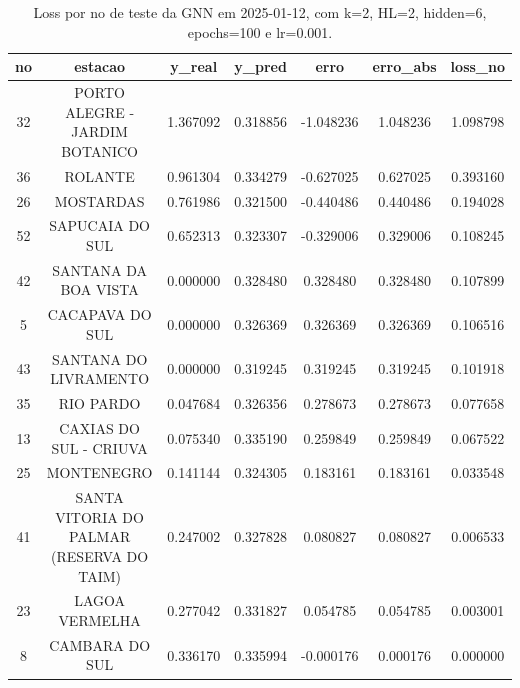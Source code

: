 \begin{table}[h]
\centering
\caption{Loss por no de teste da GNN em 2025-01-12, com k=2, HL=2, hidden=6, epochs=100 e lr=0.001.}
\label{tab:gnn_loss_k2_hl2_h6_e100_d20250112}
\begin{tabular}{ccccccc}
\toprule
no & estacao & y\_real & y\_pred & erro & erro\_abs & loss\_no \\
\midrule
32 & PORTO ALEGRE - JARDIM BOTANICO & 1.367092 & 0.318856 & -1.048236 & 1.048236 & 1.098798 \\
36 & ROLANTE & 0.961304 & 0.334279 & -0.627025 & 0.627025 & 0.393160 \\
26 & MOSTARDAS & 0.761986 & 0.321500 & -0.440486 & 0.440486 & 0.194028 \\
52 & SAPUCAIA DO SUL & 0.652313 & 0.323307 & -0.329006 & 0.329006 & 0.108245 \\
42 & SANTANA DA BOA VISTA & 0.000000 & 0.328480 & 0.328480 & 0.328480 & 0.107899 \\
5 & CACAPAVA DO SUL & 0.000000 & 0.326369 & 0.326369 & 0.326369 & 0.106516 \\
43 & SANTANA DO LIVRAMENTO & 0.000000 & 0.319245 & 0.319245 & 0.319245 & 0.101918 \\
35 & RIO PARDO & 0.047684 & 0.326356 & 0.278673 & 0.278673 & 0.077658 \\
13 & CAXIAS DO SUL - CRIUVA & 0.075340 & 0.335190 & 0.259849 & 0.259849 & 0.067522 \\
25 & MONTENEGRO & 0.141144 & 0.324305 & 0.183161 & 0.183161 & 0.033548 \\
41 & SANTA VITORIA DO PALMAR (RESERVA DO TAIM) & 0.247002 & 0.327828 & 0.080827 & 0.080827 & 0.006533 \\
23 & LAGOA VERMELHA & 0.277042 & 0.331827 & 0.054785 & 0.054785 & 0.003001 \\
8 & CAMBARA DO SUL & 0.336170 & 0.335994 & -0.000176 & 0.000176 & 0.000000 \\
\bottomrule
\end{tabular}
\end{table}
